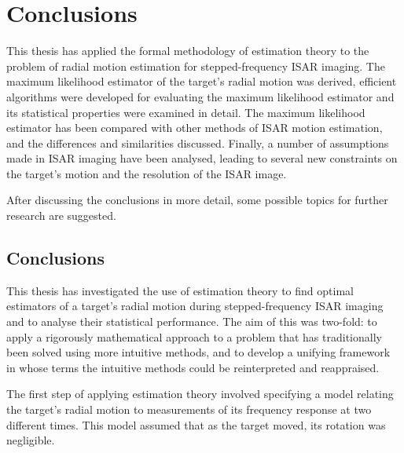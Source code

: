%
%
%
%
%
%
%

\chapter{Conclusions}
\label{co chp}

\bigletter This thesis has applied the formal methodology of estimation
theory to the problem of radial motion estimation for stepped-frequency
ISAR imaging. The maximum likelihood estimator of the target's radial
motion was derived, efficient algorithms were developed for evaluating the
maximum likelihood estimator and its statistical properties were
examined in detail. The maximum likelihood estimator has been compared with
other methods of ISAR motion estimation, and the differences and
similarities discussed. Finally, a number of assumptions made in ISAR
imaging have been analysed, leading to several new constraints on the
target's motion and the resolution of the ISAR image.

After discussing the conclusions in more detail, some possible topics for
further research are suggested.

\section{Conclusions}

This thesis has investigated the use of estimation theory to find optimal
estimators of a target's radial motion during stepped-frequency ISAR
imaging and to analyse their statistical performance.  The aim of this was
two-fold: to apply a rigorously mathematical approach to a problem that 
has traditionally been solved using more intuitive methods, and to develop
a unifying framework in whose terms the intuitive methods could be
reinterpreted and reappraised.


The first step of applying estimation theory involved specifying a model
relating the target's radial motion to measurements of its frequency
response at two different times.  This model assumed that as the target
moved, its rotation was negligible.  


